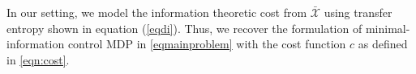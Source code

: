 





In our setting, we model the information theoretic cost from $\mathcal{\bar{X}}$ using transfer entropy shown in equation (\ref{eqdi}). Thus, we recover the formulation of minimal-information control MDP in \eqref{eqmainproblem} with the cost function $c$ as defined in \eqref{eqn:cost}. 

